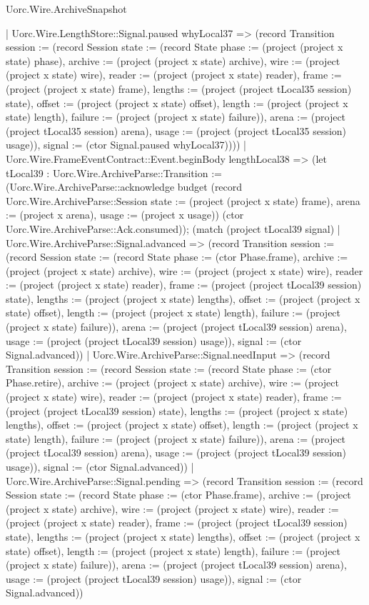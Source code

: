 \begin{lexlean}{Uorc.Wire.ArchiveSnapshot}
\begin{semanticmodule}
{        | Uorc.Wire.LengthStore::Signal.paused whyLocal37 => (record Transition {session := (record Session {state := (record State {phase := (project (project x state) phase), archive := (project (project x state) archive), wire := (project (project x state) wire), reader := (project (project x state) reader), frame := (project (project x state) frame), lengths := (project (project tLocal35 session) state), offset := (project (project x state) offset), length := (project (project x state) length), failure := (project (project x state) failure)}), arena := (project (project tLocal35 session) arena), usage := (project (project tLocal35 session) usage)}), signal := (ctor Signal.paused whyLocal37)})))
      | Uorc.Wire.FrameEventContract::Event.beginBody lengthLocal38 => (let tLocal39 : Uorc.Wire.ArchiveParse::Transition := (Uorc.Wire.ArchiveParse::acknowledge budget (record Uorc.Wire.ArchiveParse::Session {state := (project (project x state) frame), arena := (project x arena), usage := (project x usage)}) (ctor Uorc.Wire.ArchiveParse::Ack.consumed)); (match (project tLocal39 signal)
        | Uorc.Wire.ArchiveParse::Signal.advanced => (record Transition {session := (record Session {state := (record State {phase := (ctor Phase.frame), archive := (project (project x state) archive), wire := (project (project x state) wire), reader := (project (project x state) reader), frame := (project (project tLocal39 session) state), lengths := (project (project x state) lengths), offset := (project (project x state) offset), length := (project (project x state) length), failure := (project (project x state) failure)}), arena := (project (project tLocal39 session) arena), usage := (project (project tLocal39 session) usage)}), signal := (ctor Signal.advanced)})
        | Uorc.Wire.ArchiveParse::Signal.needInput => (record Transition {session := (record Session {state := (record State {phase := (ctor Phase.retire), archive := (project (project x state) archive), wire := (project (project x state) wire), reader := (project (project x state) reader), frame := (project (project tLocal39 session) state), lengths := (project (project x state) lengths), offset := (project (project x state) offset), length := (project (project x state) length), failure := (project (project x state) failure)}), arena := (project (project tLocal39 session) arena), usage := (project (project tLocal39 session) usage)}), signal := (ctor Signal.advanced)})
        | Uorc.Wire.ArchiveParse::Signal.pending => (record Transition {session := (record Session {state := (record State {phase := (ctor Phase.frame), archive := (project (project x state) archive), wire := (project (project x state) wire), reader := (project (project x state) reader), frame := (project (project tLocal39 session) state), lengths := (project (project x state) lengths), offset := (project (project x state) offset), length := (project (project x state) length), failure := (project (project x state) failure)}), arena := (project (project tLocal39 session) arena), usage := (project (project tLocal39 session) usage)}), signal := (ctor Signal.advanced)})
}
\end{semanticmodule}
\end{lexlean}
